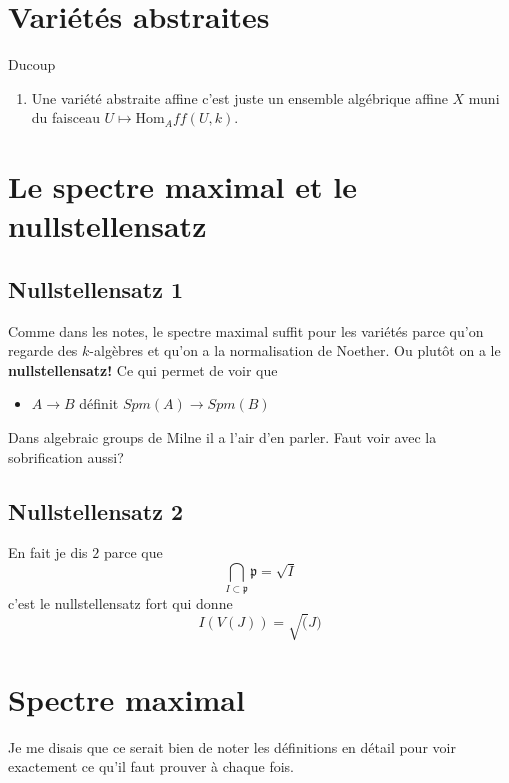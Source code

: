 \documentclass[a4paper,12pt]{book}
\newcommand{\Hom}{\textrm{Hom}}
\newcommand{\p}{\mathfrak{p}}
\theoremstyle{plain}
\theoremstyle{definition}
\theoremstyle{remark}
\begin{document}
\chapter{Variétés abstraites}
Ducoup 
\begin{enumerate}
    \item Une variété abstraite affine c'est juste un ensemble algébrique
	affine $X$ muni du faisceau $U\mapsto \Hom_Aff(U, k)$.
\end{enumerate}

\chapter{Le spectre maximal et le nullstellensatz}
\section{Nullstellensatz 1}
Comme dans les notes, le spectre maximal suffit pour 
les variétés parce qu'on regarde des $k$-algèbres et
qu'on a la normalisation de Noether. Ou plutôt on a le 
\textbf{nullstellensatz!} Ce qui permet de voir que 
\begin{itemize}
    \item $A\to B$ définit $Spm(A)\to Spm(B)$
\end{itemize}
Dans algebraic groups de Milne il a l'air d'en parler. Faut voir
avec la sobrification aussi?
\section{Nullstellensatz 2}
En fait je dis $2$ parce que 
\[\bigcap_{I\subset \p} \p =\sqrt{I}\]
c'est le nullstellensatz fort qui donne 
\[I(V(J))=\sqrt(J)\]



\chapter{Spectre maximal}

Je me disais que ce serait bien de noter les définitions
en détail pour voir exactement ce qu'il faut prouver à 
chaque fois.
\end{document}

